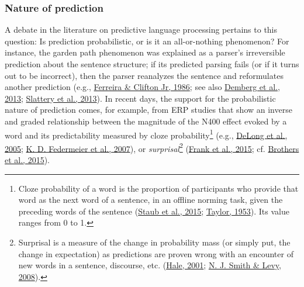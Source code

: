 \documentclass[a4paper, nobind]{templates/ociamthesis}
\begin{document}
\hypertarget{nature-of-prediction}{%
\subsubsection{Nature of prediction}\label{nature-of-prediction}}

\noindent
A debate in the literature on predictive language processing pertains to this question: Is prediction probabilistic, or is it an all-or-nothing phenomenon?
For instance, the garden path phenomenon was explained as a parser's irreversible prediction about the sentence structure;
if its predicted parsing fails (or if it turns out to be incorrect), then the parser reanalyzes the sentence and reformulates another prediction (e.g., \protect\hyperlink{ref-Ferreira1986}{Ferreira \& Clifton Jr, 1986}; see also \protect\hyperlink{ref-Demberg2013}{Demberg et al., 2013}; \protect\hyperlink{ref-Slattery2013}{Slattery et al., 2013}).
In recent days, the support for the probabilistic nature of prediction comes, for example, from ERP studies that show an inverse and graded relationship between the magnitude of the N400 effect evoked by a word and its predictability measured by cloze probability\footnote{Cloze probability of a word is the proportion of participants who provide that word as the next word of a sentence, in an offline norming task, given the preceding words of the sentence (\protect\hyperlink{ref-Staub2015a}{Staub et al., 2015}; \protect\hyperlink{ref-Taylor1953}{Taylor, 1953}). Its value ranges from 0 to 1.} (e.g., \protect\hyperlink{ref-Delong2005}{DeLong et al., 2005}; \protect\hyperlink{ref-Federmeier2007b}{K. D. Federmeier et al., 2007}), or \emph{surprisal}\footnote{Surprisal is a measure of the change in probability mass (or simply put, the change in expectation) as predictions are proven wrong with an encounter of new words in a sentence, discourse, etc. (\protect\hyperlink{ref-Hale2001}{Hale, 2001}; \protect\hyperlink{ref-Smith2008}{N. J. Smith \& Levy, 2008}).} (\protect\hyperlink{ref-Frank2015}{Frank et al., 2015}; cf. \protect\hyperlink{ref-Brothers2015}{Brothers et al., 2015}).
\end{document}
